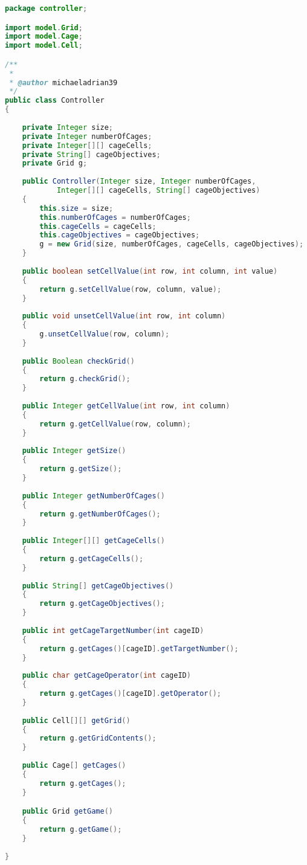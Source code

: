 \begin{lstlisting}[language=Java,basicstyle=\tiny,caption=Controller.java]
package controller;

import model.Grid;
import model.Cage;
import model.Cell;

/**
 *
 * @author michaeladrian39
 */
public class Controller
{
    
    private Integer size;
    private Integer numberOfCages;
    private Integer[][] cageCells;
    private String[] cageObjectives;
    private Grid g;
    
    public Controller(Integer size, Integer numberOfCages, 
            Integer[][] cageCells, String[] cageObjectives)
    {
        this.size = size;
        this.numberOfCages = numberOfCages;
        this.cageCells = cageCells;
        this.cageObjectives = cageObjectives;
        g = new Grid(size, numberOfCages, cageCells, cageObjectives);
    }
    
    public boolean setCellValue(int row, int column, int value)
    {
        return g.setCellValue(row, column, value);
    }
    
    public void unsetCellValue(int row, int column)
    {
        g.unsetCellValue(row, column);
    }
    
    public Boolean checkGrid()
    {
        return g.checkGrid();
    }
    
    public Integer getCellValue(int row, int column)
    {
        return g.getCellValue(row, column);
    }
    
    public Integer getSize()
    {
        return g.getSize();
    }
    
    public Integer getNumberOfCages()
    {
        return g.getNumberOfCages();
    }
    
    public Integer[][] getCageCells()
    {
        return g.getCageCells();
    } 
    
    public String[] getCageObjectives()
    {
        return g.getCageObjectives();
    }
    
    public int getCageTargetNumber(int cageID)
    {
        return g.getCages()[cageID].getTargetNumber();
    }
    
    public char getCageOperator(int cageID)
    {
        return g.getCages()[cageID].getOperator();
    }
    
    public Cell[][] getGrid()
    {
        return g.getGridContents();
    }
    
    public Cage[] getCages()
    {
        return g.getCages();
    }

    public Grid getGame()
    {
        return g.getGame();
    }
    
}
\end{lstlisting}

